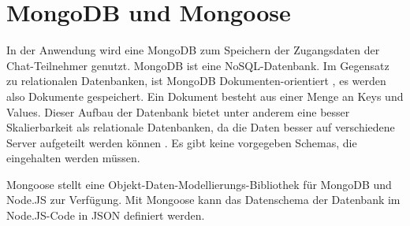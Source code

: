 \section{MongoDB und Mongoose}\label{sec:MongoDB}
In der Anwendung wird eine MongoDB zum Speichern der Zugangsdaten der Chat-Teilnehmer genutzt. MongoDB ist eine NoSQL-Datenbank. Im Gegensatz zu relationalen Datenbanken, ist MongoDB Dokumenten-orientiert \cite[vgl.][3]{Chadorow.2013}, es werden also Dokumente gespeichert. 
Ein Dokument besteht aus einer Menge an Keys und Values. Dieser Aufbau der Datenbank bietet unter anderem eine
besser Skalierbarkeit als relationale Datenbanken, da die Daten besser auf verschiedene Server aufgeteilt werden
können \cite[vgl.][4]{Chadorow.2013}. Es gibt keine vorgegeben Schemas, die eingehalten werden müssen.

Mongoose stellt eine Objekt-Daten-Modellierungs-Bibliothek für MongoDB und
Node.JS zur Verfügung. Mit Mongoose kann das Datenschema der Datenbank im
Node.JS-Code in JSON definiert werden. \cite[vgl.][10]{Holmes.2013}


